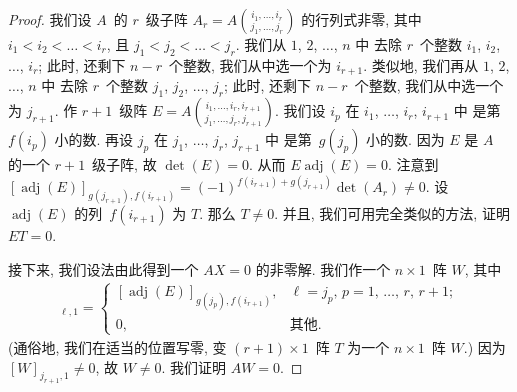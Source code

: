 \begin{proof}
    我们设 \(A\)~的 \(r\)~级子阵
    \(
    \displaystyle
    A_r = A\binom{i_1,\dots,i_r}{j_1,\dots,j_r}
    \)
    的行列式非零,
    其中 \(i_1 < i_2 < \dots < i_r\),
    且 \(j_1 < j_2 < \dots < j_r\).
    我们从 \(1\), \(2\), \(\dots\), \(n\) 中
    去除 \(r\)~个整数
    \(i_1\), \(i_2\), \(\dots\), \(i_r\);
    此时, 还剩下 \(n-r\)~个整数,
    我们从中选一个为 \(i_{r+1}\).
    类似地,
    我们再从 \(1\), \(2\), \(\dots\), \(n\) 中
    去除 \(r\)~个整数
    \(j_1\), \(j_2\), \(\dots\), \(j_r\);
    此时, 还剩下 \(n-r\)~个整数,
    我们从中选一个为 \(j_{r+1}\).
    作 \(r+1\)~级阵
    \(
    \displaystyle
    E =
    A\binom{i_1,\dots,i_r,i_{r+1}}
    {j_1,\dots,j_r,j_{r+1}}
    \).
    我们设 \(i_p\) 在
    \(i_1\), \(\dots\), \(i_r\), \(i_{r+1}\) 中%
    是第~\(f(i_p)\) 小的数.
    再设 \(j_p\) 在
    \(j_1\), \(\dots\), \(j_r\), \(j_{r+1}\) 中%
    是第~\(g(j_p)\) 小的数.
    因为 \(E\) 是 \(A\) 的一个 \(r+1\)~级子阵,
    故 \(\det {(E)} = 0\).
    从而
    \(E \operatorname{adj} {(E)} = 0\).
    注意到
    \([\operatorname{adj} {(E)}]_{g(j_{r+1}), f(i_{r+1})}
    = (-1)^{f(i_{r+1})+g(j_{r+1})} \det {(A_r)} \neq 0\).
    设 \(\operatorname{adj} {(E)}\)
    的列~\(f(i_{r+1})\) 为 \(T\).
    那么 \(T \neq 0\).
    并且, 我们可用完全类似的方法, 证明
    \(ET = 0\).

    接下来, 我们设法由此得到一个 \(AX = 0\)
    的非零解.
    我们作一个 \(n \times 1\)~阵 \(W\), 其中
    \begin{align*}
        [W]_{\ell,1}
        = \begin{cases}
              [\operatorname{adj} {(E)}]_{g(j_p),f(i_{r+1})},
                 & \text{\(\ell = j_p\),
              \(p = 1\), \(\dots\), \(r\), \(r+1\)}; \\
              0, & \text{其他}.
          \end{cases}
    \end{align*}
    (通俗地, 我们在适当的位置写零,
    变 \((r+1) \times 1\)~阵 \(T\)
    为一个 \(n \times 1\)~阵 \(W\).)
    因为 \([W]_{j_{r+1},1} \neq 0\),
    故 \(W \neq 0\).
    我们证明 \(AW = 0\).


\end{proof}
